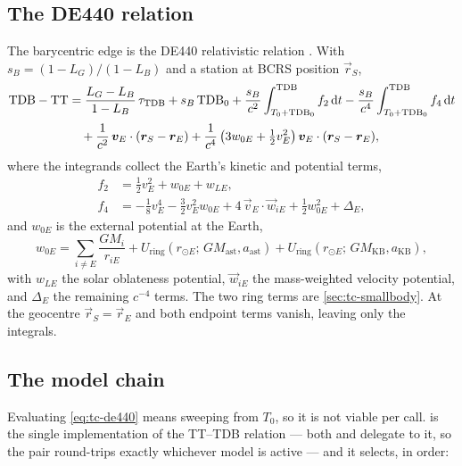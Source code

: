 \subsection{The DE440 relation}

The barycentric edge is the DE440 relativistic relation
\citep[Eqs.~3--7]{park2021de440}. With $s_B = (1-L_G)/(1-L_B)$ and a station at
BCRS position $\vec{r}_S$,
%
\begin{equation}
\label{eq:tc-de440}
\begin{aligned}
  \mathrm{TDB} - \mathrm{TT}
    &= \frac{L_G - L_B}{1 - L_B}\,\tau_{\mathrm{TDB}}
     + s_B\,\mathrm{TDB}_0
     + \frac{s_B}{c^{2}} \int_{T_0 + \mathrm{TDB}_0}^{\mathrm{TDB}} f_2 \,\mathrm{d} t
     - \frac{s_B}{c^{4}} \int_{T_0 + \mathrm{TDB}_0}^{\mathrm{TDB}} f_4 \,\mathrm{d} t \\[2pt]
    &\quad + \frac{1}{c^{2}}\,\bm{v}_E \cdot (\bm{r}_S - \bm{r}_E)
     + \frac{1}{c^{4}}\left(3 w_{0E} + \tfrac{1}{2} v_E^{2}\right)
       \bm{v}_E \cdot (\bm{r}_S - \bm{r}_E),
\end{aligned}
\end{equation}
%
where the integrands collect the Earth's kinetic and potential terms,
%
\begin{align}
  \label{eq:tc-f2}
  f_2 &= \tfrac{1}{2} v_E^{2} + w_{0E} + w_{LE}, \\
  \label{eq:tc-f4}
  f_4 &= -\tfrac{1}{8} v_E^{4} - \tfrac{3}{2} v_E^{2} w_{0E}
         + 4\,\vec{v}_E \cdot \vec{w}_{iE}
         + \tfrac{1}{2} w_{0E}^{2} + \Delta_E ,
\end{align}
%
and $w_{0E}$ is the external potential at the Earth,
%
\begin{equation}
\label{eq:tc-w0e}
  w_{0E} = \sum_{i \neq E} \frac{GM_i}{r_{iE}}
  + U_{\mathrm{ring}}(r_{\odot E};\, GM_{\mathrm{ast}}, a_{\mathrm{ast}})
  + U_{\mathrm{ring}}(r_{\odot E};\, GM_{\mathrm{KB}}, a_{\mathrm{KB}}),
\end{equation}
%
with $w_{LE}$ the solar oblateness potential, $\vec{w}_{iE}$ the mass-weighted
velocity potential, and $\Delta_E$ the remaining $c^{-4}$ terms. The two ring
terms are \cref{sec:tc-smallbody}. At the geocentre $\vec{r}_S = \vec{r}_E$ and
both endpoint terms vanish, leaving only the integrals.

\subsection{The model chain}
\label{sec:tc-model-chain}

Evaluating \cref{eq:tc-de440} means sweeping from $T_0$, so it is not viable
per call.  is the single implementation of the TT--TDB
relation --- both  and  delegate to it, so the pair
round-trips exactly whichever model is active --- and it selects, in order:

